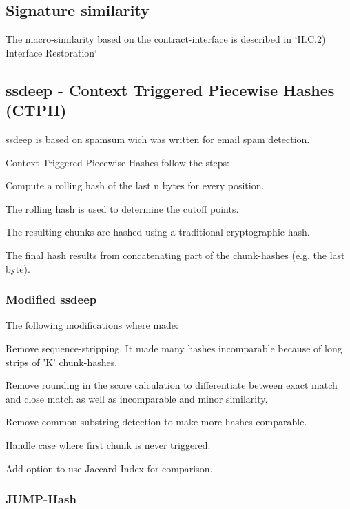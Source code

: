 \documentclass[../main.tex]{subfiles}
\begin{document}

\subsection{Signature similarity}

The macro-similarity based on the contract-interface is described in `II.C.2) Interface Restoration`

\subsection{ssdeep - Context Triggered Piecewise Hashes (CTPH)}
ssdeep is based on spamsum\cite{spamsum} wich was written for email spam detection.

Context Triggered Piecewise Hashes follow the steps:
\begin{ol}
  \item Compute a rolling hash of the last n bytes for every position.
  \item The rolling hash is used to determine the cutoff points.
  \item The resulting chunks are hashed using a traditional cryptographic hash.
  \item The final hash results from concatenating part of the chunk-hashes (e.g. the last byte).
\end{ol}

\subsubsection{Modified ssdeep}
The following modifications where made:
\begin{ul}
  \item Remove sequence-stripping. It made many hashes incomparable because of long strips of 'K' chunk-hashes.
  \item Remove rounding in the score calculation to differentiate between exact match and close match as well as incomparable and minor similarity.
  \item Remove common substring detection to make more hashes comparable.
  \item Handle case where first chunk is never triggered.
  \item Add option to use Jaccard-Index for comparison.
\end{ul}

\subsubsection{JUMP-Hash}
\end{document}
